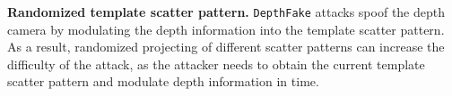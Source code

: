 \textbf{Randomized template scatter pattern.}  \texttt{DepthFake} attacks spoof the depth camera by modulating the depth information into the template scatter pattern. As a result, randomized projecting of different scatter patterns can increase the difficulty of the attack, as the attacker needs to obtain the current template scatter pattern and modulate depth information in time.



